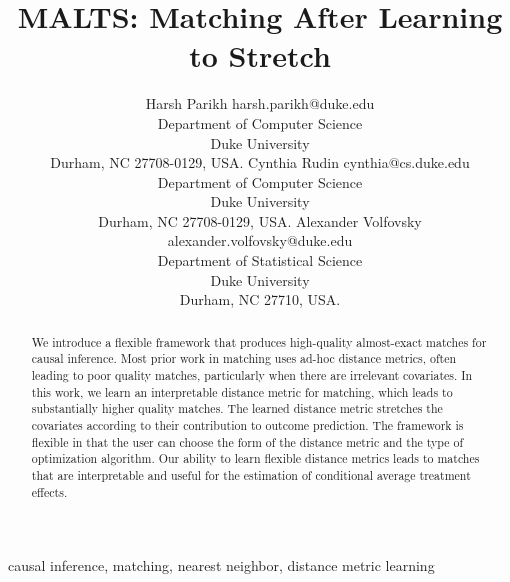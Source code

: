 \documentclass[twoside,11pt]{article}
\title{MALTS: Matching After Learning to Stretch}
\author{\name Harsh Parikh \email           harsh.parikh@duke.edu \\
        \addr Department of Computer Science\\
        Duke University\\
        Durham, NC 27708-0129, USA.
        \AND
        \name Cynthia Rudin \email cynthia@cs.duke.edu \\
        \addr Department of Computer Science\\
        Duke University\\
        Durham, NC 27708-0129, USA.
        \AND
        \name Alexander Volfovsky \email alexander.volfovsky@duke.edu\\
        \addr Department of Statistical Science\\
        Duke University\\
        Durham, NC 27710, USA.
     }
\begin{document}
	
  	\maketitle

    \begin{abstract}
		We introduce a flexible framework that produces high-quality almost-exact matches for causal inference. Most prior work in matching uses ad-hoc distance metrics, often leading to poor quality matches, particularly when there are irrelevant covariates. In this work, we learn an interpretable distance metric for matching, which leads to substantially higher quality matches. The learned distance metric stretches the covariates according to their contribution to outcome prediction.
        The framework is flexible in that the user can choose the form of the distance metric and the type of optimization algorithm. Our ability to learn flexible distance metrics leads to matches that are interpretable and useful for the estimation of conditional average treatment effects.
	\end{abstract}

\begin{keywords}
  causal inference, matching, nearest neighbor, distance metric learning
\end{keywords}
	\allowdisplaybreaks
	
	
	
	
	
	
	

	

% 	
 	{}
	
\appendix

    
    
    
    
\end{document}
